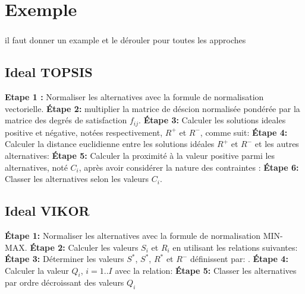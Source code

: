 \documentclass[french, 11pt, a4paper, oldfontcommands]{report}
\begin{document}
\section{Exemple}
	\subsubsection{}
{\huge il faut donner un example et le dérouler pour toutes les approches}
\subsection{Ideal TOPSIS}
	\par 
	\textbf{Etape 1 :}  Normaliser les alternatives avec la formule de normalisation vectorielle.
	\textbf{Étape 2:} multiplier la matrice de déscion normalisée pondérée par la matrice des degrés de satisfaction  $f_{ij}$.
	\textbf{Étape 3:} Calculer les solutions ideales positive et négative, notées respectivement, $R^+$ et $R^-$, comme suit:
	\textbf{Étape 4:}  Calculer la distance euclidienne entre les solutions idéales $R^+$ et $R^-$ et les autres alternatives:
	\textbf{Étape 5:} Calculer la proximité à la valeur positive parmi les alternatives, noté $C_i$, après avoir considérer la nature des contraintes : 
	\textbf{Étape 6:} Classer les alternatives selon les valeurs $C_i$.

\subsection{Ideal VIKOR}
	\textbf{Étape 1:} Normaliser les alternatives avec la formule de normalisation MIN-MAX.
	\textbf{Étape 2:} Calculer les valeurs $S_i$ et $R_i$ en utilisant les relations suivantes:
	\textbf{Étape 3:} Déterminer les valeurs $S^*$, $S^*$, $R^*$ et $R^-$ définissent par: .
	\textbf{Étape 4:}  Calculer la valeur $Q_i$, $i = 1..I$ avec la relation:
	\textbf{Étape 5:}  Classer les alternatives par ordre décroissant des valeurs $Q_i$
\end{document}

